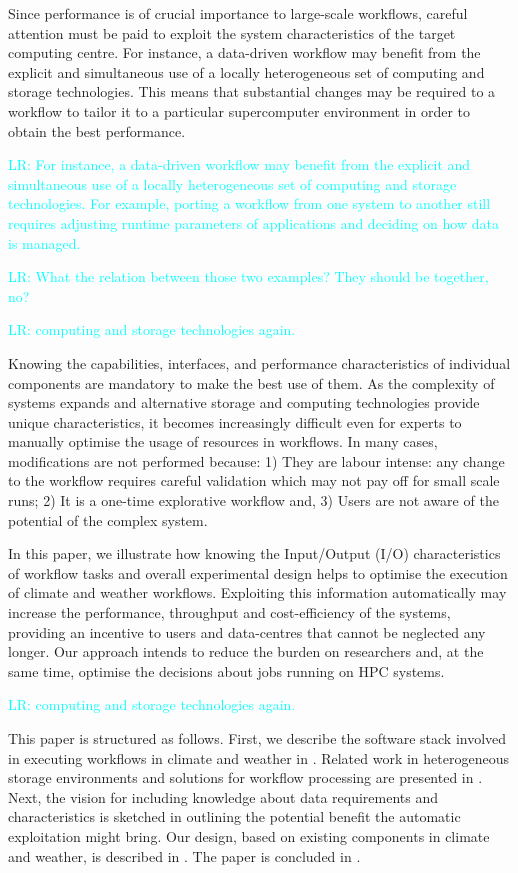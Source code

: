 \documentclass{superfri}
\newcommand{\lr}[1]{\textcolor{cyan}{LR: #1}}
\begin{document}
Since performance is of crucial importance to large-scale workflows, careful attention must be paid to exploit the system characteristics of the target computing centre.
For instance, a data-driven workflow may benefit from the explicit and simultaneous use of a locally heterogeneous set of computing and storage technologies.
This means that substantial changes may be required to a workflow to tailor it to a particular supercomputer environment in order to obtain the best performance.

\lr{For instance, a data-driven workflow may benefit from the explicit and simultaneous use of a locally heterogeneous set of computing and storage technologies.
For example, porting a workflow from one system to another still requires adjusting runtime parameters of applications and deciding on how data is managed.}

\lr{What the relation between those two examples? They should be together, no?}

\lr{computing and storage technologies again.}

Knowing the capabilities, interfaces, and performance characteristics of individual components are mandatory to make the best use of them.
As the complexity of systems expands and alternative storage and computing technologies provide unique characteristics, it becomes increasingly difficult even for experts to manually optimise the usage of resources in workflows. In many cases, modifications are not performed because: 1) They are labour intense: any change to the workflow requires careful validation which may not pay off for small scale runs; 2) It is a one-time explorative workflow and, 3) Users are not aware of the potential of the complex system.

In this paper, we illustrate how knowing the Input/Output (I/O) characteristics of workflow tasks and overall experimental design helps to optimise the execution of climate and weather workflows.
Exploiting this information automatically may increase the performance, throughput and cost-efficiency of the systems, providing an incentive to users and data-centres that cannot be neglected any longer.
Our approach intends to reduce the burden on researchers and, at the same time, optimise the decisions about jobs running on HPC systems.

\lr{computing and storage technologies again.}

This paper is structured as follows.
First, we describe the software stack involved in executing workflows in climate and weather in .
Related work in heterogeneous storage environments and solutions for workflow processing are presented in .
Next, the vision for including knowledge about data requirements and characteristics is sketched in  outlining the potential benefit the automatic exploitation might bring.
Our design, based on existing components in climate and weather, is described in .
The paper is concluded in .
\end{document}

